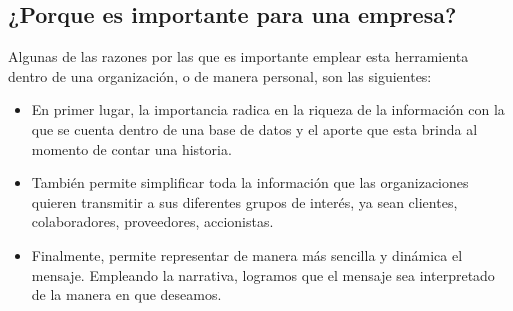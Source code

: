 \documentclass[twoside,twocolumn]{article}
\begin{document}
\subsection{¿Porque es importante para una empresa?}
Algunas de las razones por las que es importante emplear esta herramienta dentro de una organización, o de manera personal, son las siguientes:
\begin{itemize}
    \item En primer lugar, la importancia radica en la riqueza de la información con la que se cuenta dentro de una base de datos y el aporte que esta brinda al momento de contar una historia.
    \item También permite simplificar toda la información que las organizaciones quieren transmitir a sus diferentes grupos de interés, ya sean clientes, colaboradores, proveedores, accionistas.
    \item Finalmente, permite representar de manera más sencilla y dinámica el mensaje. Empleando la narrativa, logramos que el mensaje sea interpretado de la manera en que deseamos.
\end{itemize}
\end{document}
